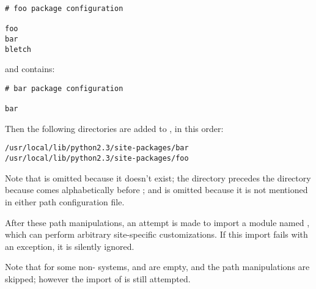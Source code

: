 \begin{verbatim}
# foo package configuration

foo
bar
bletch
\end{verbatim}

and  contains:

\begin{verbatim}
# bar package configuration

bar
\end{verbatim}

Then the following directories are added to , in this
order:

\begin{verbatim}
/usr/local/lib/python2.3/site-packages/bar
/usr/local/lib/python2.3/site-packages/foo
\end{verbatim}

Note that  is omitted because it doesn't exist; the
 directory precedes the  directory because
 comes alphabetically before ; and
 is omitted because it is not mentioned in either path
configuration file.

After these path manipulations, an attempt is made to import a module
named , which can
perform arbitrary site-specific customizations.  If this import fails
with an  exception, it is silently ignored.

Note that for some non-\UNIX{} systems,  and
 are empty, and the path manipulations are
skipped; however the import of
 is still attempted.
